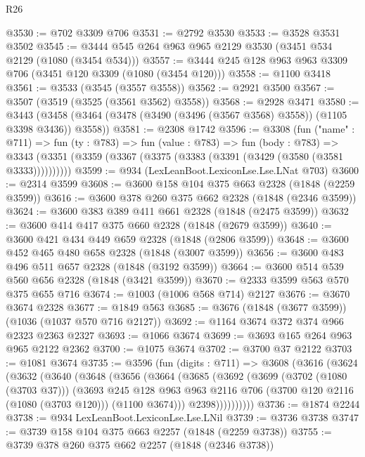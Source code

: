 \begin{lexlean}{R26}
\begin{coremodule}
@3530 := @702 @3309 @706
@3531 := @2792 @3530
@3533 := @3528 @3531 @3502
@3545 := @3444 @545 @264 @963 @965 @2129 @3530 (@3451 @534 @2129 (@1080 (@3454 @534)))
@3557 := @3444 @245 @128 @963 @963 @3309 @706 (@3451 @120 @3309 (@1080 (@3454 @120)))
@3558 := @1100 @3418
@3561 := @3533 (@3545 (@3557 @3558))
@3562 := @2921 @3500
@3567 := @3507 (@3519 (@3525 (@3561 @3562) @3558))
@3568 := @2928 @3471
@3580 := @3443 (@3458 (@3464 (@3478 (@3490 (@3496 (@3567 @3568) @3558)) (@1105 @3398 @3436)) @3558))
@3581 := @2308 @1742
@3596 := @3308
    (fun ("name" : @711) =>
    fun (ty : @783) =>
    fun (value : @783) =>
    fun (body : @783) =>
    @3343 (@3351 (@3359 (@3367 (@3375 (@3383 (@3391 (@3429 (@3580 (@3581 @3333))))))))))
@3599 := @934 (LexLeanBoot.LexiconLse.Lse.LNat @703)
@3600 := @2314 @3599
@3608 := @3600 @158 @104 @375 @663 @2328 (@1848 (@2259 @3599))
@3616 := @3600 @378 @260 @375 @662 @2328 (@1848 (@2346 @3599))
@3624 := @3600 @383 @389 @411 @661 @2328 (@1848 (@2475 @3599))
@3632 := @3600 @414 @417 @375 @660 @2328 (@1848 (@2679 @3599))
@3640 := @3600 @421 @434 @449 @659 @2328 (@1848 (@2806 @3599))
@3648 := @3600 @452 @465 @480 @658 @2328 (@1848 (@3007 @3599))
@3656 := @3600 @483 @496 @511 @657 @2328 (@1848 (@3192 @3599))
@3664 := @3600 @514 @539 @560 @656 @2328 (@1848 (@3421 @3599))
@3670 := @2333 @3599 @563 @570 @375 @655 @716
@3674 := @1003 (@1006 @568 @714) @2127
@3676 := @3670 @3674 @2328
@3677 := @1849 @563
@3685 := @3676 (@1848 (@3677 @3599)) (@1036 (@1037 @570 @716 @2127))
@3692 := @1164 @3674 @372 @374 @966 @2323 @2363 @2327
@3693 := @1066 @3674
@3699 := @3693 @165 @264 @963 @965 @2122 @2362
@3700 := @1075 @3674
@3702 := @3700 @37 @2122
@3703 := @1081 @3674
@3735 := @3596
    (fun (digits : @711) =>
    @3608
      (@3616
        (@3624
          (@3632
            (@3640
              (@3648
                (@3656
                  (@3664
                    (@3685
                      (@3692
                        (@3699
                          (@3702 (@1080 (@3703 @37)))
                          (@3693
                            @245
                            @128
                            @963
                            @963
                            @2116
                            @706
                            (@3700 @120 @2116 (@1080 (@3703 @120)))
                            (@1100 @3674)))
                        @2398))))))))))
@3736 := @1874 @2244
@3738 := @934 LexLeanBoot.LexiconLse.Lse.LNil
@3739 := @3736 @3738
@3747 := @3739 @158 @104 @375 @663 @2257 (@1848 (@2259 @3738))
@3755 := @3739 @378 @260 @375 @662 @2257 (@1848 (@2346 @3738))

\end{coremodule}
\end{lexlean}
